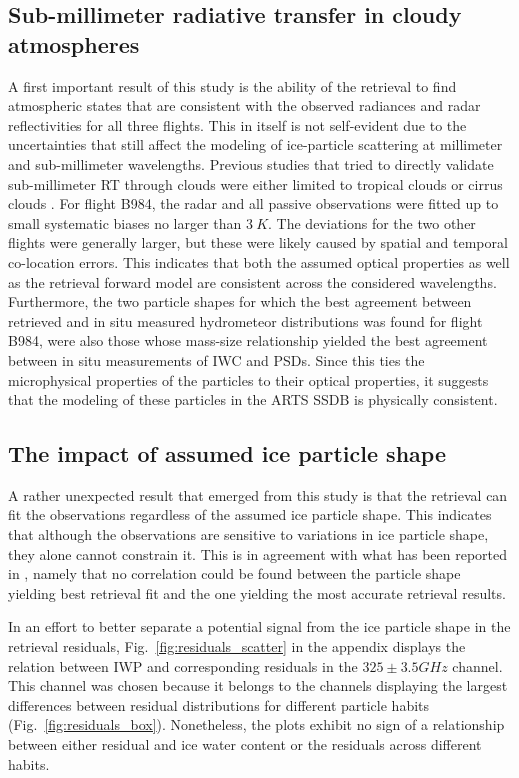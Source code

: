 \documentclass[journal abbreviation, manuscript]{copernicus}
\begin{document}
\subsection{Sub-millimeter radiative transfer in cloudy atmospheres}

 A first important result of this study is the ability of the retrieval to find
 atmospheric states that are consistent with the observed radiances and radar
 reflectivities for all three flights. This in itself is not self-evident due to
 the uncertainties that still affect the modeling of ice-particle scattering at
 millimeter and sub-millimeter wavelengths. Previous studies that tried to
 directly validate sub-millimeter RT through clouds were either limited to
 tropical clouds \citep{evans05, eriksson07} or cirrus clouds \citep{fox17}. For
 flight B984, the radar and all passive observations were fitted up to small
 systematic biases no larger than $3\ \unit{K}$. The deviations for the two
 other flights were generally larger, but these were likely caused by spatial
 and temporal co-location errors. This indicates that both the assumed optical
 properties as well as the retrieval forward model are consistent across the
 considered wavelengths. Furthermore, the two particle shapes for which the best
 agreement between retrieved and in situ measured hydrometeor distributions was
 found for flight B984, were also those whose mass-size relationship yielded the
 best agreement between in situ measurements of IWC and PSDs. Since this ties
 the microphysical properties of the particles to their optical properties, it
 suggests that the modeling of these particles in the ARTS SSDB is physically
 consistent.

\subsection{The impact of assumed ice particle shape}

A rather unexpected result that emerged from this study is that the retrieval
can fit the observations regardless of the assumed ice particle shape. This
indicates that although the observations are sensitive to variations in ice
particle shape, they alone cannot constrain it. This is in agreement with what
has been reported in \citet{pfreundschuh20}, namely that no correlation could be
found between the particle shape yielding best retrieval fit and the one
yielding the most accurate retrieval results.

In an effort to better separate a potential signal from the ice particle shape
in the retrieval residuals, Fig.~\ref{fig:residuals_scatter} in the appendix
displays the relation between IWP and corresponding residuals in the $325 \pm
3.5 \unit{GHz}$ channel. This channel was chosen because it belongs to the
channels displaying the largest differences between residual distributions for
different particle habits (Fig.~\ref{fig:residuals_box}). Nonetheless, the
plots exhibit no sign of a relationship between either residual and ice
water content or the residuals across different habits.
\end{document}
